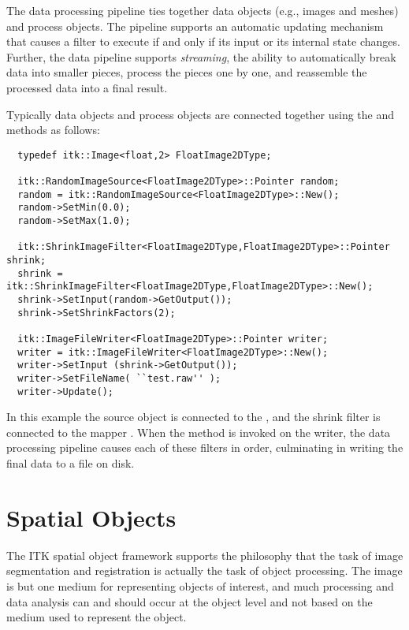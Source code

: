 
The data processing pipeline ties together data objects (e.g., images and
meshes) and process objects. The pipeline supports an automatic updating
mechanism that causes a filter to execute if and only if its input
or its internal state changes. Further, the data pipeline supports
\emph{streaming}, the ability to automatically break data into smaller
pieces, process the pieces one by one, and reassemble the processed data into
a final result.

Typically data objects and process objects are connected together using the
 and  methods as follows:

\small
\begin{verbatim}
  typedef itk::Image<float,2> FloatImage2DType;

  itk::RandomImageSource<FloatImage2DType>::Pointer random;
  random = itk::RandomImageSource<FloatImage2DType>::New();
  random->SetMin(0.0);
  random->SetMax(1.0);

  itk::ShrinkImageFilter<FloatImage2DType,FloatImage2DType>::Pointer shrink;
  shrink = itk::ShrinkImageFilter<FloatImage2DType,FloatImage2DType>::New();
  shrink->SetInput(random->GetOutput());
  shrink->SetShrinkFactors(2);

  itk::ImageFileWriter<FloatImage2DType>::Pointer writer;
  writer = itk::ImageFileWriter<FloatImage2DType>::New();
  writer->SetInput (shrink->GetOutput());
  writer->SetFileName( ``test.raw'' );
  writer->Update();
\end{verbatim}
\normalsize

In this example the source object  is connected
to the , and the shrink filter is connected to
the mapper . When the  method is
invoked on the writer, the data processing pipeline causes each of these
filters in order, culminating in writing the final data to a file on disk.

%
%
%
%
\section{Spatial Objects}
\label{sec:SpatialObjectsOverview}
%
The ITK spatial object framework supports the philosophy that the task of
image segmentation and registration is actually the task of object
processing. The image is but one medium for representing objects of interest,
and much processing and data analysis can and should occur at the object
level and not based on the medium used to represent the object.

